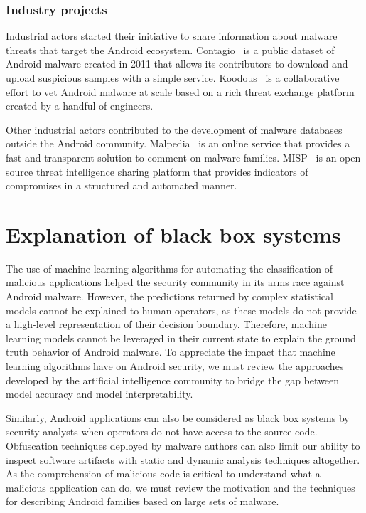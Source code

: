 \subsubsection{Industry projects}
Industrial actors started their initiative to share information about malware threats that target the Android ecosystem.
Contagio~\cite{parkour_contagio_nodate} is a public dataset of Android malware created in 2011 that allows its contributors to download and upload suspicious samples with a simple service.
Koodous~\cite{ramirez_koodous_nodate} is a collaborative effort to vet Android malware at scale based on a rich threat exchange platform created by a handful of engineers.

Other industrial actors contributed to the development of malware databases outside the Android community.
Malpedia~\cite{plohmann_malpedia_nodate} is an online service that provides a fast and transparent solution to comment on malware families.
MISP~\cite{circl_misp_nodate} is an open source threat intelligence sharing platform that provides indicators of compromises in a structured and automated manner.
\section{Explanation of black box systems}
The use of machine learning algorithms for automating the classification of malicious applications helped the security community in its arms race against Android malware.
However, the predictions returned by complex statistical models cannot be explained to human operators, as these models do not provide a high-level representation of their decision boundary.
Therefore, machine learning models cannot be leveraged in their current state to explain the ground truth behavior of Android malware.
To appreciate the impact that machine learning algorithms have on Android security, we must review the approaches developed by the artificial intelligence community to bridge the gap between model accuracy and model interpretability.

Similarly, Android applications can also be considered as black box systems by security analysts when operators do not have access to the source code.
Obfuscation techniques deployed by malware authors can also limit our ability to inspect software artifacts with static and dynamic analysis techniques altogether.
As the comprehension of malicious code is critical to understand what a malicious application can do, we must review the motivation and the techniques for describing Android families based on large sets of malware.

